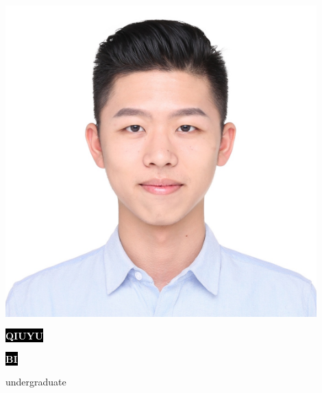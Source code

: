 \documentclass[9pt]{developercv} %
\begin{document}
\begin{minipage}{0.20\textwidth}
\includegraphics[width=0.9\textwidth]{photo.jpg}
\end{minipage}
\begin{minipage}[t]{0.30\textwidth} %
    \vspace{-\baselineskip} %

    \colorbox{black}{{\HUGE\textcolor{white}{\textbf{\MakeUppercase{Qiuyu}}}}} %

    \colorbox{black}{{\HUGE\textcolor{white}{\textbf{\MakeUppercase{Bi}}}}} %

    \vspace{6pt}

    {\huge undergraduate} %
\end{minipage}
\begin{minipage}[t]{0.275\textwidth} %
    \vspace{-\baselineskip} %

    \\
    \\
    \\
\end{minipage}
\end{document}
